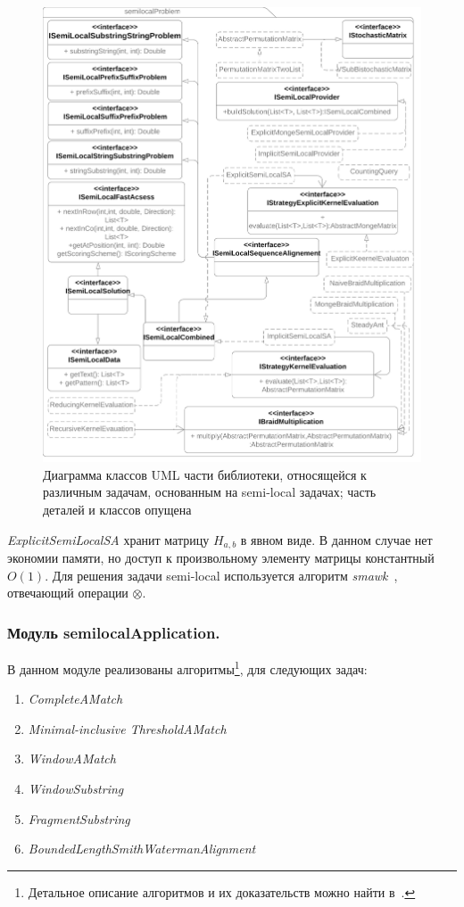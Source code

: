 \begin{figure}
  \centering
  \includegraphics[height=0.72\columnwidth,angle=90]{Mishin/figures/Library.png}
  \caption{Диаграмма классов UML части библиотеки, относящейся к различным задачам, основанным на  {semi-local} задачах; часть деталей и классов опущена}\label{fig:libraryProblem}
\end{figure}

\emph{ExplicitSemiLocalSA} хранит матрицу $H_{a,b}$ в явном виде.
В данном случае нет экономии памяти, но доступ к произвольному элементу матрицы константный $O(1)$. 
Для решения задачи {semi-local} используется алгоритм \emph{smawk}~\cite{aggarwal1987geometric}, отвечающий операции  $\otimes$.








\subsubsection{Модуль semilocalApplication.}

В данном модуле реализованы алгоритмы\footnote{Детальное описание алгоритмов и их доказательств можно найти в~\cite{tiskin2006all}.}, для следующих задач:
\begin{enumerate}
    \item \emph{CompleteAMatch}
    \item \emph{Minimal-inclusive ThresholdAMatch}
    \item \emph{WindowAMatch}
    \item \emph{WindowSubstring}
    \item \emph{FragmentSubstring}
    \item \emph{BoundedLengthSmithWatermanAlignment}
\end{enumerate}

